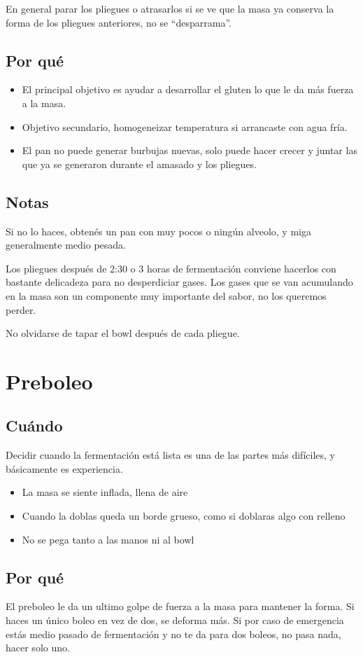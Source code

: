 \documentclass[10pt,a4paper]{article}
\begin{document}
En general parar los pliegues o atrasarlos  si se ve que la masa
ya conserva la forma de los pliegues anteriores, no se ``desparrama''.

\subsection*{Por qué}
\begin{itemize}
  \item El principal objetivo es ayudar a desarrollar el gluten lo que le da más
    fuerza a la masa.
    \item Objetivo secundario, homogeneizar temperatura si arrancaste con agua fría.
    \item El pan no puede generar burbujas nuevas, solo puede hacer crecer y
      juntar las que ya se generaron durante el amasado y los pliegues.
\end{itemize}

\subsection*{Notas}
Si no lo haces, obtenés un pan con muy pocos o ningún alveolo, y miga
generalmente medio pesada.

Los pliegues después de 2:30 o 3 horas de fermentación conviene hacerlos con
bastante delicadeza para no desperdiciar gases. Los gases que se van acumulando
en la masa son un componente muy importante del sabor, no los queremos perder.

No olvidarse de tapar el bowl después de cada pliegue.

\section{Preboleo}
\subsection*{Cuándo}
Decidir cuando la fermentación está lista es una de las partes más difíciles, y
básicamente es experiencia.

\begin{itemize}
  \item La masa se siente inflada, llena de aire
  \item Cuando la doblas queda un borde grueso, como si doblaras algo con relleno
  \item No se pega tanto a las manos ni al bowl
\end{itemize}
\subsection*{Por qué}
El preboleo le da un ultimo golpe de fuerza a la masa para mantener la forma. Si
haces un único boleo en vez de dos, se deforma más. Si por caso de emergencia
estás medio pasado de fermentación y no te da para dos boleos, no pasa nada,
hacer solo uno.
\end{document}
